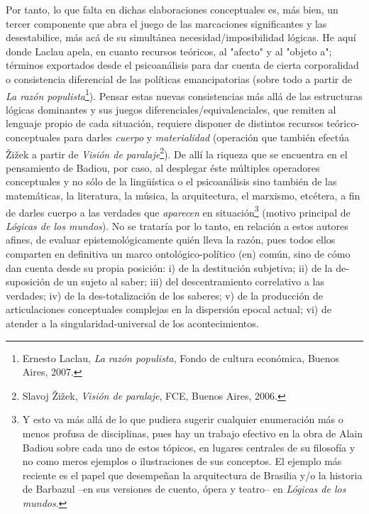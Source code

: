 \documentclass{book}
\begin{document}
Por tanto, lo que falta en dichas elaboraciones conceptuales es, más
bien, un tercer componente que abra el juego de las marcaciones
significantes y las desestabilice, más acá de su simultánea
necesidad/imposibilidad lógicas. He aquí donde Laclau apela, en cuanto
recursos teóricos, al "afecto" y al "objeto a"; términos exportados
desde el psicoanálisis para dar cuenta de cierta corporalidad o
consistencia diferencial de las políticas emancipatorias (sobre todo a
partir de \emph{La razón populista}\footnote{Ernesto Laclau, \emph{La
  razón populista}, Fondo de cultura económica, Buenos Aires, 2007.}).
Pensar estas nuevas consistencias más allá de las estructuras lógicas
dominantes y sus juegos diferenciales/equivalenciales, que remiten al
lenguaje propio de cada situación, requiere disponer de distintos
recursos teórico-conceptuales para darles \emph{cuerpo} y
\emph{materialidad} (operación que también efectúa Žižek a partir de
\emph{Visión de paralaje}\footnote{Slavoj Žižek, \emph{Visión de
  paralaje}, FCE, Buenos Aires, 2006.}). De allí la riqueza que se
encuentra en el pensamiento de Badiou, por caso, al desplegar éste
múltiples operadores conceptuales y no sólo de la lingüística o el
psicoanálisis sino también de las matemáticas, la literatura, la música,
la arquitectura, el marxismo, etcétera, a fin de darles cuerpo a las
verdades que \emph{aparecen} en situación\footnote{Y esto va más allá de
  lo que pudiera sugerir cualquier enumeración más o menos profusa de
  disciplinas, pues hay un trabajo efectivo en la obra de Alain Badiou
  sobre cada uno de estos tópicos, en lugares centrales de su filosofía
  y no como meros ejemplos o ilustraciones de sus conceptos. El ejemplo
  más reciente es el papel que desempeñan la arquitectura de Brasilia
  y/o la historia de Barbazul --en sus versiones de cuento, ópera y
  teatro-- en \emph{Lógicas de los mundos}.} (motivo principal de
\emph{Lógicas de los mundos}). No se trataría por lo tanto, en relación
a estos autores afines, de evaluar epistemológicamente quién lleva la
razón, pues todos ellos comparten en definitiva un marco
ontológico-político (en) común, sino de cómo dan cuenta desde su propia
posición: i) de la destitución subjetiva; ii) de la de-suposición de un
sujeto al saber; iii) del descentramiento correlativo a las verdades;
iv) de la des-totalización de los saberes; v) de la producción de
articulaciones conceptuales complejas en la dispersión epocal actual;
vi) de atender a la singularidad-universal de los acontecimientos.
\end{document}
